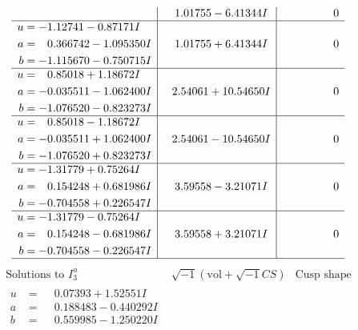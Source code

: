 \documentclass[1p]{elsarticle_modified}
\theoremstyle{definition}
\newcommand{\I}{\sqrt{-1}}
\begin{document}
$$\begin{array}{c|c|c}
 & \phantom{-}1.01755 - 6.41344 I & \phantom{-0.000000 } 0 \\ \hline\begin{aligned}
u &= -1.12741 - 0.87171 I \\
a &= \phantom{-}0.366742 - 1.095350 I \\
b &= -1.115670 - 0.750715 I\end{aligned}
 & \phantom{-}1.01755 + 6.41344 I & \phantom{-0.000000 } 0 \\ \hline\begin{aligned}
u &= \phantom{-}0.85018 + 1.18672 I \\
a &= -0.035511 - 1.062400 I \\
b &= -1.076520 - 0.823273 I\end{aligned}
 & \phantom{-}2.54061 + 10.54650 I & \phantom{-0.000000 } 0 \\ \hline\begin{aligned}
u &= \phantom{-}0.85018 - 1.18672 I \\
a &= -0.035511 + 1.062400 I \\
b &= -1.076520 + 0.823273 I\end{aligned}
 & \phantom{-}2.54061 - 10.54650 I & \phantom{-0.000000 } 0 \\ \hline\begin{aligned}
u &= -1.31779 + 0.75264 I \\
a &= \phantom{-}0.154248 + 0.681986 I \\
b &= -0.704558 + 0.226547 I\end{aligned}
 & \phantom{-}3.59558 - 3.21071 I & \phantom{-0.000000 } 0 \\ \hline\begin{aligned}
u &= -1.31779 - 0.75264 I \\
a &= \phantom{-}0.154248 - 0.681986 I \\
b &= -0.704558 - 0.226547 I\end{aligned}
 & \phantom{-}3.59558 + 3.21071 I & \phantom{-0.000000 } 0\\
 \hline 
 \end{array}$$\newpage$$\begin{array}{c|c|c}  
\text{Solutions to }I^u_{3}& \I (\text{vol} + \sqrt{-1}CS) & \text{Cusp shape}\\
 \hline 
\begin{aligned}
u &= \phantom{-}0.07393 + 1.52551 I \\
a &= \phantom{-}0.188483 - 0.440292 I \\
b &= \phantom{-}0.559985 - 1.250220 I\end{aligned}

\end{array}$$
\end{document}
